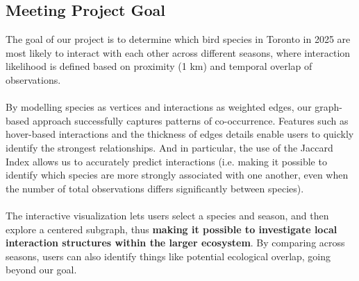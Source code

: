 \documentclass{article}
\begin{document}
\subsection*{Meeting Project Goal}
The goal of our project is to determine which bird species in Toronto in 2025 are most likely to interact with each other across different seasons, where interaction likelihood is defined based on proximity (1 km) and temporal overlap of observations. \\ \\
By modelling species as vertices and interactions as weighted edges, our graph-based approach successfully captures patterns of co-occurrence. Features such as hover-based interactions and the thickness of edges details enable users to quickly identify the strongest relationships. And in particular, the use of the Jaccard Index allows us to accurately predict interactions (i.e. making it possible to identify which species are more strongly associated with one another, even when the number of total observations differs significantly between species). \\\\ 
The interactive visualization lets users select a species and season, and then explore a centered subgraph, thus \textbf{making it possible to investigate local interaction structures within the larger ecosystem}. By comparing across seasons, users can also identify things like potential ecological overlap, going beyond our goal. \\
\end{document}
